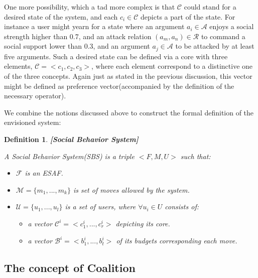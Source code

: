 \documentclass{article}
\newtheorem{definition}{Definition}
\begin{document}
One more possibility, which a tad more complex is that $\mathcal{C}$ could stand for a desired state of the system, and each $c_i \in \mathcal{C}$ depicts a part of the state. For instance a user might yearn for a state where an argument  $a_i \in \mathcal{A}$ enjoys a social strength higher than 0.7, and an attack relation $(a_m, a_n) \in \mathcal{R}$  to command a social support lower than 0.3,  and an argument $a_j \in \mathcal{A}$ to be attacked by at least five arguments. Such a desired state can be defined via a core with three elements, $\mathcal{C} = <c_1, c_2, c_3>$, where each element correspond to a distinctive one of the three concepts. Again just as stated in the previous discussion, this vector might be defined as preference vector(accompanied by the definition of the necessary operator).

We combine the notions discussed above to construct the formal definition of the envisioned system:

\begin{definition}\textbf{[Social Behavior System]}

A Social Behavior System(SBS) is a triple $<F, M, U>$ such that:

\begin{itemize}
\item $\mathcal{F}$ is an ESAF.
\item  $\mathcal{M} = \{m_1, ..., m_k\}$ is set of moves allowed by the system.
\item $\mathcal{U} = \{u_1, ..., u_l\} $ is a set of users, where $\forall u_i \in U$ consists of:
\begin{itemize}
\item a vector $\mathcal{C}^i = <c_1^i, ..., c_r^i>$ depicting its core.
\item a vector $\mathcal{B}^i = <b_1^i, ..., b_t^i>$ of its budgets corresponding each move. 
\end{itemize}
\end{itemize}

\end{definition}

\subsection{The concept of Coalition}
\end{document}
